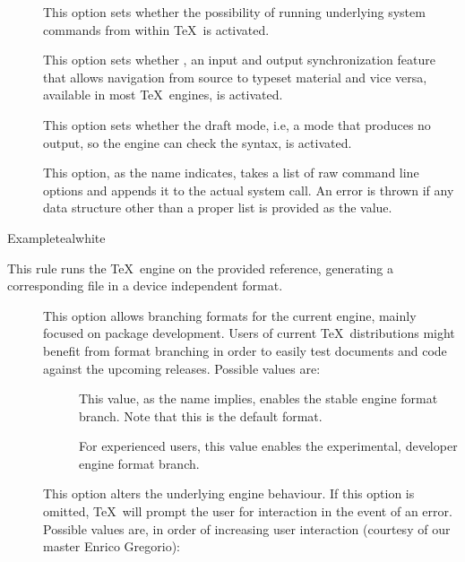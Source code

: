 \begin{description}
\begin{description}
\item[] This option sets whether the possibility of running underlying system commands from within \TeX\ is activated.

\item[] This option sets whether , an input and output synchronization feature that allows navigation from source to typeset material and vice versa, available in most \TeX\ engines, is activated.

\item[] This option sets whether the draft mode, i.e, a mode that produces no output, so the engine can check the syntax, is activated.

\item[] This option, as the name indicates, takes a list of raw command line options and appends it to the actual system call. An error is thrown if any data structure other than a proper list is provided as the value.
\end{description}

\begin{codebox}{Example}{teal}{\icnote}{white}
\end{codebox}

\item[\rulebox{platex}]
This rule runs the  \TeX\ engine on the provided  reference, generating a corresponding file in a device independent format.

\begin{description}
\item[] This option allows branching formats for the current engine, mainly focused on package development. Users of current \TeX\ distributions might benefit from format branching in order to easily test documents and code against the upcoming releases. Possible values are:

\begin{description}
\item[] This value, as the name implies, enables the stable engine format branch. Note that this is the default format.

\item[] For experienced users, this value enables the experimental, developer engine format branch.
\end{description}

\item[] This option alters the underlying engine behaviour. If this option is omitted, \TeX\ will prompt the user for interaction in the event of an error. Possible values are, in order of increasing user interaction (courtesy of our master Enrico Gregorio):


\end{description}
\end{description}
